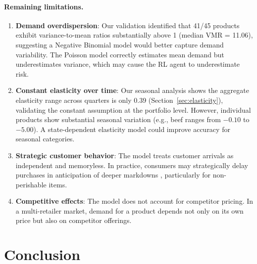 \documentclass[11pt,a4paper]{article}
\begin{document}
\paragraph{Remaining limitations.}
\begin{enumerate}
    \item \textbf{Demand overdispersion}: Our validation identified that 41/45 products exhibit variance-to-mean ratios substantially above 1 (median VMR = 11.06), suggesting a Negative Binomial model would better capture demand variability.
    The Poisson model correctly estimates mean demand but underestimates variance, which may cause the RL agent to underestimate risk.

    \item \textbf{Constant elasticity over time}: Our seasonal analysis shows the aggregate elasticity range across quarters is only 0.39 (Section~\ref{sec:elasticity}), validating the constant assumption at the portfolio level.
    However, individual products show substantial seasonal variation (e.g., beef ranges from $-0.10$ to $-5.00$).
    A state-dependent elasticity model could improve accuracy for seasonal categories.

    \item \textbf{Strategic customer behavior}: The model treats customer arrivals as independent and memoryless.
    In practice, consumers may strategically delay purchases in anticipation of deeper markdowns \citep{phillips2005}, particularly for non-perishable items.

    \item \textbf{Competitive effects}: The model does not account for competitor pricing.
    In a multi-retailer market, demand for a product depends not only on its own price but also on competitor offerings.
\end{enumerate}

\section{Conclusion}
\end{document}
